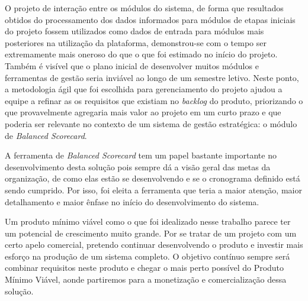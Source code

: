 \documentclass{abnt}
\begin{document}
O projeto de interação entre os módulos do sistema, de forma que resultados
obtidos do processamento dos dados informados para módulos de etapas iniciais do
projeto fossem utilizados como dados de entrada para módulos mais
posteriores na utilização da plataforma, demonstrou-se com o tempo ser
extremamente mais oneroso do que o que foi estimado no início do projeto. Também
é visível que o plano inicial de desenvolver muitos módulos e ferramentas de
gestão seria inviável ao longo de um semestre letivo. Neste ponto, a metodologia
ágil que foi escolhida para gerenciamento do projeto ajudou a equipe a refinar
as os requisitos que existiam no \textit{backlog} do produto, priorizando o que
provavelmente agregaria mais valor ao projeto em um curto prazo e que poderia
ser relevante no contexto de um sistema de gestão estratégica: o módulo de
\textit{Balanced Scorecard}.

A ferramenta de \textit{Balanced Scorecard} tem um papel bastante importante no
desenvolvimento desta solução pois sempre dá a visão geral das metas da
organização, de como elas estão se desenvolvendo e se o cronograma definido está
sendo cumprido. Por isso, foi eleita a ferramenta que teria a maior atenção,
maior detalhamento e maior ênfase no início do desenvolvimento do sistema.

Um produto mínimo viável como o que foi idealizado nesse trabalho parece ter um
potencial de crescimento muito grande. Por se tratar de um projeto com um certo
apelo comercial, pretendo continuar desenvolvendo o produto e investir mais
esforço na produção de um sistema completo. O objetivo contínuo sempre será
combinar requisitos neste produto e chegar o mais perto possível do Produto
Mínimo Viável, aonde partiremos para a monetização e comercialização dessa
solução.


\end{document}
